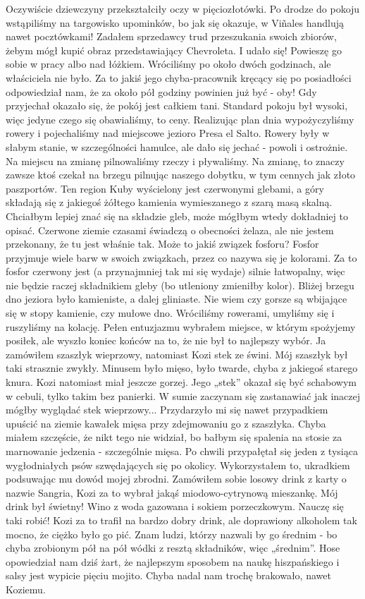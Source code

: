 \noindent Oczywiście dziewczyny przekształciły oczy w pięciozłotówki.
Po drodze do pokoju wstąpiliśmy na targowisko upominków, bo jak się okazuje, w Viñales handlują nawet pocztówkami!
Zadałem sprzedawcy trud przeszukania swoich zbiorów, żebym mógł kupić obraz przedstawiający Chevroleta.
I udało się!
Powieszę go sobie w pracy albo nad łóżkiem.
Wróciliśmy po około dwóch godzinach, ale właściciela nie było.
Za to jakiś jego chyba-pracownik kręcący się po posiadłości odpowiedział nam, że za około pół godziny powinien już być - oby!
Gdy przyjechał okazało się, że pokój jest całkiem tani. Standard pokoju był wysoki, więc jedyne czego się obawialiśmy, to ceny.
Realizując plan dnia wypożyczyliśmy rowery i pojechaliśmy nad miejscowe jezioro Presa el Salto.
Rowery były w słabym stanie, w szczególności hamulce, ale dało się jechać - powoli i ostrożnie.
Na miejscu na zmianę pilnowaliśmy rzeczy i pływaliśmy.
Na zmianę, to znaczy zawsze ktoś czekał na brzegu pilnując naszego dobytku, w tym cennych jak złoto paszportów.
Ten region Kuby wyścielony jest czerwonymi glebami, a góry składają się z jakiegoś żółtego kamienia wymieszanego z szarą masą skalną.
Chciałbym lepiej znać się na składzie gleb, może mógłbym wtedy dokładniej to opisać.
Czerwone ziemie czasami świadczą o obecności żelaza, ale nie jestem przekonany, że tu jest właśnie tak.
Może to jakiś związek fosforu?
Fosfor przyjmuje wiele barw w swoich związkach, przez co nazywa się je kolorami.
Za to fosfor czerwony jest (a przynajmniej tak mi się wydaje) silnie łatwopalny, więc nie będzie raczej składnikiem gleby (bo utleniony zmieniłby kolor).
Bliżej brzegu dno jeziora było kamieniste, a dalej gliniaste.
Nie wiem czy gorsze są wbijające się w stopy kamienie, czy mułowe dno.
Wróciliśmy rowerami, umyliśmy się i ruszyliśmy na kolację.
Pełen entuzjazmu wybrałem miejsce, w którym spożyjemy posiłek, ale wyszło koniec końców na to, że nie był to najlepszy wybór.
Ja zamówiłem szaszłyk wieprzowy, natomiast Kozi stek ze świni.
Mój szaszłyk był taki strasznie zwykły.
Minusem było mięso, było twarde, chyba z jakiegoś starego knura.
Kozi natomiast miał jeszcze gorzej.
Jego „stek” okazał się być schabowym w cebuli, tylko takim bez panierki.
W sumie zaczynam się zastanawiać jak inaczej mógłby wyglądać stek wieprzowy...
Przydarzyło mi się nawet przypadkiem upuścić na ziemie kawałek mięsa przy zdejmowaniu go z szaszłyka.
Chyba miałem szczęście, że nikt tego nie widział, bo bałbym się spalenia na stosie za marnowanie jedzenia - szczególnie mięsa.
Po chwili przypałętał się jeden z tysiąca wygłodniałych psów szwędających się po okolicy.
Wykorzystałem to, ukradkiem podsuwając mu dowód mojej zbrodni.
Zamówiłem sobie losowy drink z karty o nazwie Sangria, Kozi za to wybrał jakąś miodowo-cytrynową mieszankę.
Mój drink był świetny!
Wino z woda gazowana i sokiem porzeczkowym.
Nauczę się taki robić!
Kozi za to trafił na bardzo dobry drink, ale doprawiony alkoholem tak mocno, że ciężko było go pić.
Znam ludzi, którzy nazwali by go średnim - bo chyba zrobionym pół na pół wódki z resztą składników, więc „średnim”.
Hose opowiedział nam dziś żart, że najlepszym sposobem na naukę hiszpańskiego i salsy jest wypicie pięciu mojito.
Chyba nadal nam trochę brakowało, nawet Koziemu.